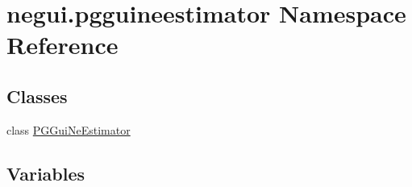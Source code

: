 \hypertarget{namespacenegui_1_1pgguineestimator}{}\section{negui.\+pgguineestimator Namespace Reference}
\label{namespacenegui_1_1pgguineestimator}
\subsection*{Classes}
\begin{DoxyCompactItemize}
\item 
class \hyperlink{classnegui_1_1pgguineestimator_1_1PGGuiNeEstimator}{P\+G\+Gui\+Ne\+Estimator}
\end{DoxyCompactItemize}
\subsection*{Variables}

